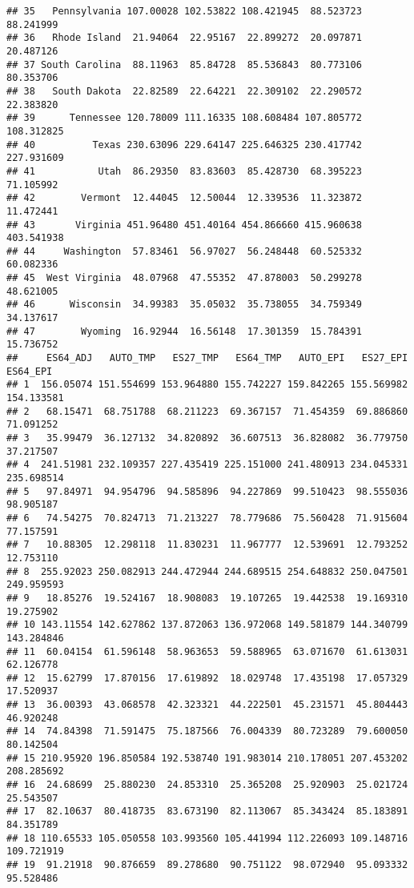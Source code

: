 \documentclass[
]{article}
\begin{document}
\begin{verbatim}
## 35   Pennsylvania 107.00028 102.53822 108.421945  88.523723  88.241999
## 36   Rhode Island  21.94064  22.95167  22.899272  20.097871  20.487126
## 37 South Carolina  88.11963  85.84728  85.536843  80.773106  80.353706
## 38   South Dakota  22.82589  22.64221  22.309102  22.290572  22.383820
## 39      Tennessee 120.78009 111.16335 108.608484 107.805772 108.312825
## 40          Texas 230.63096 229.64147 225.646325 230.417742 227.931609
## 41           Utah  86.29350  83.83603  85.428730  68.395223  71.105992
## 42        Vermont  12.44045  12.50044  12.339536  11.323872  11.472441
## 43       Virginia 451.96480 451.40164 454.866660 415.960638 403.541938
## 44     Washington  57.83461  56.97027  56.248448  60.525332  60.082336
## 45  West Virginia  48.07968  47.55352  47.878003  50.299278  48.621005
## 46      Wisconsin  34.99383  35.05032  35.738055  34.759349  34.137617
## 47        Wyoming  16.92944  16.56148  17.301359  15.784391  15.736752
##     ES64_ADJ   AUTO_TMP   ES27_TMP   ES64_TMP   AUTO_EPI   ES27_EPI   ES64_EPI
## 1  156.05074 151.554699 153.964880 155.742227 159.842265 155.569982 154.133581
## 2   68.15471  68.751788  68.211223  69.367157  71.454359  69.886860  71.091252
## 3   35.99479  36.127132  34.820892  36.607513  36.828082  36.779750  37.217507
## 4  241.51981 232.109357 227.435419 225.151000 241.480913 234.045331 235.698514
## 5   97.84971  94.954796  94.585896  94.227869  99.510423  98.555036  98.905187
## 6   74.54275  70.824713  71.213227  78.779686  75.560428  71.915604  77.157591
## 7   10.88305  12.298118  11.830231  11.967777  12.539691  12.793252  12.753110
## 8  255.92023 250.082913 244.472944 244.689515 254.648832 250.047501 249.959593
## 9   18.85276  19.524167  18.908083  19.107265  19.442538  19.169310  19.275902
## 10 143.11554 142.627862 137.872063 136.972068 149.581879 144.340799 143.284846
## 11  60.04154  61.596148  58.963653  59.588965  63.071670  61.613031  62.126778
## 12  15.62799  17.870156  17.619892  18.029748  17.435198  17.057329  17.520937
## 13  36.00393  43.068578  42.323321  44.222501  45.231571  45.804443  46.920248
## 14  74.84398  71.591475  75.187566  76.004339  80.723289  79.600050  80.142504
## 15 210.95920 196.850584 192.538740 191.983014 210.178051 207.453202 208.285692
## 16  24.68699  25.880230  24.853310  25.365208  25.920903  25.021724  25.543507
## 17  82.10637  80.418735  83.673190  82.113067  85.343424  85.183891  84.351789
## 18 110.65533 105.050558 103.993560 105.441994 112.226093 109.148716 109.721919
## 19  91.21918  90.876659  89.278680  90.751122  98.072940  95.093332  95.528486

\end{verbatim}
\end{document}
